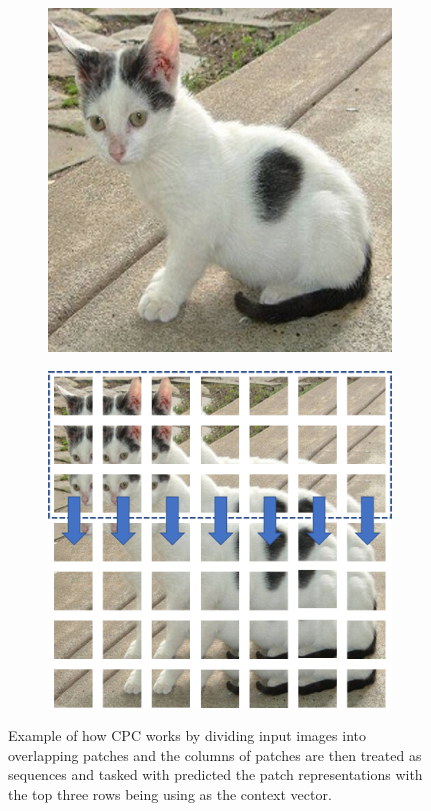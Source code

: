 \begin{figure}[h]
	\centering
	\begin{subfigure}{0.4\textwidth}
		\includegraphics[width=\linewidth]{images/cat.jpg}
	\end{subfigure}
	\begin{subfigure}{0.4\textwidth}
		\includegraphics[width=\linewidth]{images/cat_grid_v2.png}
	\end{subfigure}
	\caption{Example of how CPC works by dividing input images into overlapping patches and the columns of patches are then treated as sequences and tasked with predicted the patch representations with the top three rows being using as the context vector.}
	\label{fig:example_cpc}
\end{figure}

